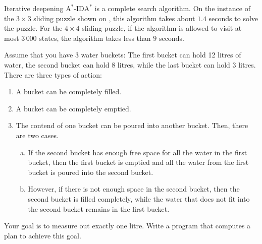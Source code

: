 Iterative deepening $\mathrm{A}^*$-$\mathrm{IDA}^*$ is a complete search algorithm. 
On the instance of the $3 \times 3$ sliding puzzle shown on , this
algorithm takes about $1.4$ seconds to solve the puzzle.  For the $4 \times 4$ sliding puzzle, if the algorithm
is allowed to visit at most $3\,000$ states, the algorithm takes less than $9$ seconds.  


\exercise
Assume that you have 3 water buckets:  The first bucket can hold 12 litres of water, the second bucket can hold 8 litres,
while the last bucket can hold 3 litres.  There are three types of action:
\begin{enumerate}
\item A bucket can be completely filled.
\item A bucket can be completely emptied.
\item The contend of one bucket can be poured into another bucket.  Then, there are two cases.
      \begin{enumerate}[(a)]
      \item If the second bucket has enough free space for all the water in the first bucket, 
            then the first bucket is emptied and all the water from the first bucket is poured 
            into the second bucket.  
      \item However, if there is not enough space in the second bucket, then the second bucket is filled
            completely, while the water that does not fit into the second bucket remains in the first bucket.  
      \end{enumerate}
\end{enumerate}
Your goal is to measure out exactly one litre.  Write a program that computes a plan to achieve this goal.
\eox
\pagebreak

